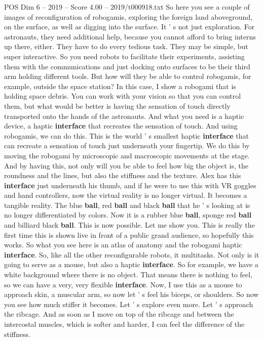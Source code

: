 \begin{textsample}{POS Dim 6 – 2019 – Score 4.00 – 2019/t000918.txt}
So here you see a couple of images of reconfiguration of robogamis, exploring the foreign land aboveground, on the surface, as well as digging into the surface.
It ' s not just exploration.
For astronauts, they need additional help, because you cannot afford to bring interns up there, either.
They have to do every tedious task.
They may be simple, but super interactive.
So you need robots to facilitate their experiments, assisting them with the communications and just docking onto surfaces to be their third arm holding different tools.
But how will they be able to control robogamis, for example, outside the space station?
In this case, I show a robogami that is holding space debris.
You can work with your vision so that you can control them, but what would be better is having the sensation of touch directly transported onto the hands of the astronauts.
And what you need is a haptic device, a haptic \textbf{interface} that recreates the sensation of touch.
And using robogamis, we can do this.
This is the world ' s smallest haptic \textbf{interface} that can recreate a sensation of touch just underneath your fingertip.
We do this by moving the robogami by microscopic and macroscopic movements at the stage.
And by having this, not only will you be able to feel how big the object is, the roundness and the lines, but also the stiffness and the texture.
Alex has this \textbf{interface} just underneath his thumb, and if he were to use this with VR goggles and hand controllers, now the virtual reality is no longer virtual.
It becomes a tangible reality.
The blue \textbf{ball}, red \textbf{ball} and black \textbf{ball} that he ' s looking at is no longer differentiated by colors.
Now it is a rubber blue \textbf{ball}, sponge red \textbf{ball} and billiard black \textbf{ball}.
This is now possible.
Let me show you.
This is really the first time this is shown live in front of a public grand audience, so hopefully this works.
So what you see here is an atlas of anatomy and the robogami haptic \textbf{interface}.
So, like all the other reconfigurable robots, it multitasks.
Not only is it going to serve as a mouse, but also a haptic \textbf{interface}.
So for example, we have a white background where there is no object.
That means there is nothing to feel, so we can have a very, very flexible \textbf{interface}.
Now, I use this as a mouse to approach skin, a muscular arm, so now let ' s feel his biceps, or shoulders.
So now you see how much stiffer it becomes.
Let ' s explore even more.
Let ' s approach the ribcage.
And as soon as I move on top of the ribcage and between the intercostal muscles, which is softer and harder, I can feel the difference of the stiffness.

\end{textsample}
